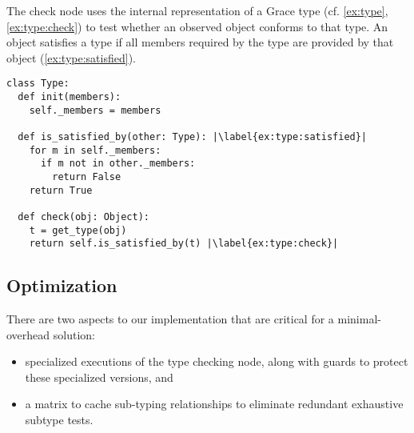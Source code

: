 
%

The check node uses the internal representation of a Grace type
(cf. \cref{ex:type}, \cref{ex:type:check}) to test whether an observed
object conforms to that type. 
An object satisfies a type if all members required by the type are provided
by that object (\cref{ex:type:satisfied}).


\begin{lstlisting}[label={ex:type},escapechar=|,caption={Sketch of a \code{Type} in our system and its \code{check()} semantics.},float,floatplacement=htb,columns=flexible,float,floatplacement=H]
class Type:
  def init(members):
    self._members = members

  def is_satisfied_by(other: Type): |\label{ex:type:satisfied}|
    for m in self._members:
      if m not in other._members:
        return False
    return True

  def check(obj: Object):
    t = get_type(obj)
    return self.is_satisfied_by(t) |\label{ex:type:check}|
\end{lstlisting}


\subsection{Optimization}
\label{ssec:optimization}

There are two aspects to our implementation that are critical for a minimal-overhead solution:

\begin{itemize}
  \item specialized executions of the type checking node, along with guards to protect these specialized versions, and
  \item a matrix to cache sub-typing relationships to eliminate
    redundant exhaustive subtype tests.
\end{itemize}
 

